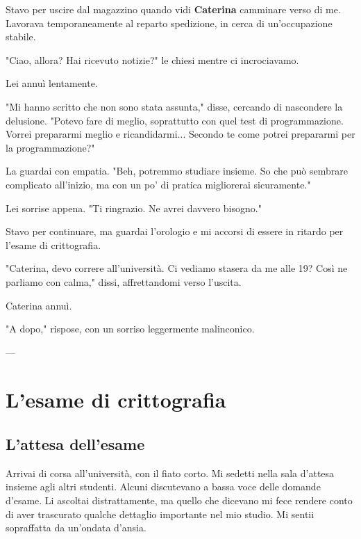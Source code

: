 Stavo per uscire dal magazzino quando vidi \textbf{Caterina} camminare verso di me. Lavorava temporaneamente al reparto spedizione, in cerca di un'occupazione stabile.

"Ciao, allora? Hai ricevuto notizie?" le chiesi mentre ci incrociavamo.

Lei annuì lentamente.

"Mi hanno scritto che non sono stata assunta," disse, cercando di nascondere la delusione. "Potevo fare di meglio, soprattutto con quel test di programmazione. Vorrei prepararmi meglio e ricandidarmi... Secondo te come potrei prepararmi per la programmazione?"

La guardai con empatia. "Beh, potremmo studiare insieme. So che può sembrare complicato all'inizio, ma con un po' di pratica migliorerai sicuramente."

Lei sorrise appena. "Ti ringrazio. Ne avrei davvero bisogno."

Stavo per continuare, ma guardai l'orologio e mi accorsi di essere in ritardo per l’esame di crittografia.

"Caterina, devo correre all’università. Ci vediamo stasera da me alle 19? Così ne parliamo con calma," dissi, affrettandomi verso l’uscita.

Caterina annuì.

"A dopo," rispose, con un sorriso leggermente malinconico.

---

\section{L'esame di crittografia}

\subsection{L'attesa dell'esame}

Arrivai di corsa all’università, con il fiato corto. Mi sedetti nella sala d'attesa insieme agli altri studenti. Alcuni discutevano a bassa voce delle domande d’esame. Li ascoltai distrattamente, ma quello che dicevano mi fece rendere conto di aver trascurato qualche dettaglio importante nel mio studio. Mi sentii sopraffatta da un’ondata d'ansia.


